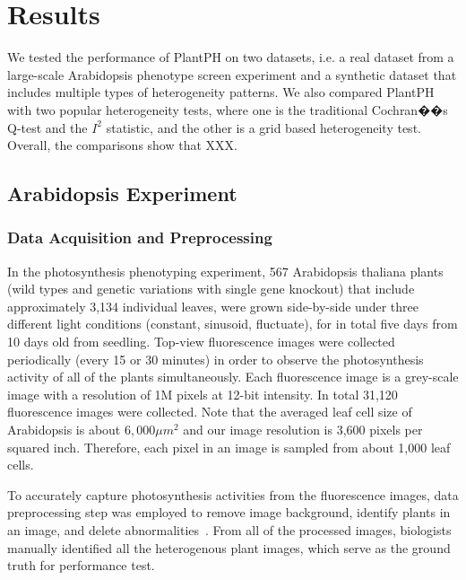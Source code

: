 \documentclass{bioinfo}
\begin{document}
\section{Results}

We tested the performance of PlantPH on two datasets, i.e. a real dataset from a large-scale Arabidopsis phenotype screen experiment and a synthetic dataset that includes multiple types of heterogeneity patterns. We also compared PlantPH with two popular heterogeneity tests, where one is the traditional Cochran��s Q-test and the $I^2$ statistic, and the other is a grid based heterogeneity test. Overall, the comparisons show that XXX.

\subsection{Arabidopsis Experiment}

\subsubsection{Data Acquisition and Preprocessing}

In the photosynthesis phenotyping experiment, 567 Arabidopsis thaliana plants (wild types and genetic variations with single gene knockout) that include approximately 3,134 individual leaves, were grown side-by-side under three different light conditions (constant, sinusoid, fluctuate), for in total five days from 10 days old from seedling.
%
Top-view fluorescence images were collected periodically (every 15 or 30 minutes) in order to observe the photosynthesis activity of all of the plants simultaneously. Each fluorescence image is a grey-scale image with a resolution of 1M pixels at 12-bit intensity. In total 31,120 fluorescence images were collected. Note that the averaged leaf cell size of Arabidopsis is about $6,000 \mu m^2$ \citep{gegas2014endopolyploidy} and our image resolution is 3,600 pixels per squared inch. Therefore, each pixel in an image is sampled from about 1,000 leaf cells.

To accurately capture photosynthesis activities from the fluorescence images, data preprocessing step was employed to remove image background, identify plants in an image, and delete abnormalities~\citep{xu2015plant}. From all of the processed images,  biologists manually identified all the heterogenous plant images, which serve as the ground truth for performance test.

\end{document}
